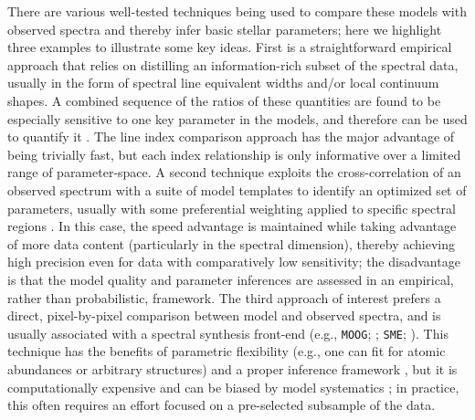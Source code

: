 \documentclass[iop,floatfix]{emulateapj}
\begin{document}
There are various well-tested techniques being used to compare these models with observed spectra 
and thereby infer basic stellar parameters; here we highlight three examples to illustrate some key 
ideas.  First is a straightforward empirical approach that relies on distilling an information-rich 
subset of the spectral data, usually in the form of spectral line equivalent widths and/or local 
continuum shapes.  A combined sequence of the ratios of these quantities are found to be especially 
sensitive to one key parameter in the models, and therefore can be used to quantify it 
\citep[e.g.,][]{gray94,reid95,rojas-ayala10,rojas-ayala12}.  The line index comparison approach has 
the major advantage of being trivially fast, but each index relationship is only informative over 
a limited range of parameter-space.  A second technique exploits the cross-correlation of an 
observed spectrum with a suite of model templates to identify an optimized set of parameters, 
usually with some preferential weighting applied to specific spectral regions \citep[e.g., {\tt 
SPC};][]{buchhave12}.  In this case, the speed advantage is maintained while taking advantage of 
more data content (particularly in the spectral dimension), thereby achieving high precision even 
for data with comparatively low sensitivity; the disadvantage is that the model quality and 
parameter inferences are assessed in an empirical, rather than probabilistic, framework.  The third 
approach of interest prefers a direct, pixel-by-pixel comparison between model and observed 
spectra, and is usually associated with a spectral synthesis front-end (e.g., {\tt MOOG}; 
\citealt{sneden73}; {\tt SME}; \citealt{valenti96}).  This technique has the benefits of parametric 
flexibility (e.g., one can fit for atomic abundances or arbitrary structures) and a proper 
inference framework \citep[usually a least-squares approach, although increasingly in a Bayesian 
format;][]{shkedy07,schoenrich13}, but it is computationally expensive and can be biased by model 
systematics \citep[e.g.,][]{mann13}; in practice, this often requires an effort focused on a 
pre-selected subsample of the data. 
\end{document}
